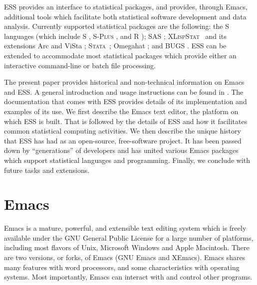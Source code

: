 \documentclass{article}
\newcommand*{\SAS}{\textsc{SAS}{\textregistered} }
\newcommand*{\Splus}{\textsc{S-Plus}}
\newcommand*{\XLispStat}{\textsc{XLispStat}}
\newcommand*{\Stata}{\textsc{Stata}}
\begin{document}
ESS provides an interface to statistical packages, and provides,
through Emacs, additional tools which facilitate both statistical
software development and data analysis.  Currently supported
statistical packages are the following: the S languages (which include
S \citep{BecRCW88,ChaJH92,ChaJ98}, \Splus{} \citep{Splus}, and R
\citep{ihak:gent:1996}); \SAS \citep{SAS:8.0}; \XLispStat\ 
\citep{Tier90} and its extensions Arc \citep{Cook:Weisberg:1999} and
ViSta \citep{youn:fald:mcfa:1992}; \Stata\ \citep{Stata:6.0}; Omegahat
\citep{DTLang:2000}; and BUGS \citep{SpieThomBest:1999}.  ESS can be
extended to accommodate most statistical packages which provide either
an interactive command-line or batch file processing.

The present paper provides historical and non-technical information on
Emacs and ESS.  A general introduction and usage instructions can be
found in \cite{heiberger:dsc:2001}.  The documentation that comes with
ESS provides details of its implementation and examples of its use.
We first describe the Emacs text editor, the platform on which ESS is
built.  That is followed by the details of ESS and how it facilitates
common statistical computing activities.  We then describe the unique
history that ESS has had as an open-source, free-software project.  
It has been passed down by ``generations'' of developers and has 
united various Emacs packages which support
statistical languages and programming.  Finally, we conclude with
future tasks and extensions.

\section{Emacs}
\label{sec:emacs}

Emacs is a mature, powerful, and extensible text editing system which
is freely available under the GNU General Public License for a large
number of platforms, including most flavors of Unix, Microsoft Windows
and Apple Macintosh.  There are two versions, or forks, of Emacs (GNU
Emacs \citep{RMS:2000} and XEmacs).  Emacs shares many features with
word processors, and some characteristics with operating systems.
Most importantly, Emacs can interact with and control other programs.
\end{document}
